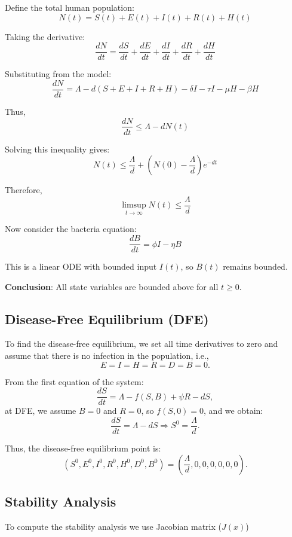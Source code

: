 \documentclass[a4paper,12pt]{report}
\begin{document}
\begin{itemize}
Define the total human population:
\[
N(t) = S(t) + E(t) + I(t) + R(t) + H(t)
\]

Taking the derivative:
\[
\frac{dN}{dt} = \frac{dS}{dt} + \frac{dE}{dt} + \frac{dI}{dt} + \frac{dR}{dt} + \frac{dH}{dt}
\]

Substituting from the model:
\[
\frac{dN}{dt} = \Lambda - d(S + E + I + R + H) - \delta I - \tau I - \mu H - \beta H
\]

Thus,
\[
\frac{dN}{dt} \leq \Lambda - dN(t)
\]

Solving this inequality gives:
\[
N(t) \leq \frac{\Lambda}{d} + \left(N(0) - \frac{\Lambda}{d}\right)e^{-dt}
\]

Therefore,
\[
\limsup_{t \to \infty} N(t) \leq \frac{\Lambda}{d}
\]

Now consider the bacteria equation:
\[
\frac{dB}{dt} = \phi I - \eta B
\]

This is a linear ODE with bounded input $I(t)$, so $B(t)$ remains bounded.

\textbf{Conclusion}: All state variables are bounded above for all $t \geq 0$.

\subsection{ Disease-Free Equilibrium (DFE)}
To find the disease-free equilibrium, we set all time derivatives to zero and assume that there is no infection in the population, i.e.,
\[
E = I = H =R= D = B = 0.
\]

From the first equation of the system:
\[
\frac{dS}{dt} = \Lambda - f(S,B) + \psi R - dS,
\]
at DFE, we assume \(B = 0\) and \(R = 0\), so \(f(S,0) = 0\), and we obtain:
\[
\frac{dS}{dt} = \Lambda - dS \Rightarrow S^0 = \frac{\Lambda}{d}.
\]

Thus, the disease-free equilibrium point is:
\[
(S^0, E^0, I^0, R^0, H^0, D^0, B^0) = \left( \frac{\Lambda}{d}, 0, 0, 0, 0, 0, 0 \right).
\]
\subsection{ Stability Analysis}
To compute the stability analysis we use Jacobian matrix (\(J(x)\))\\


\end{itemize}
\end{document}
